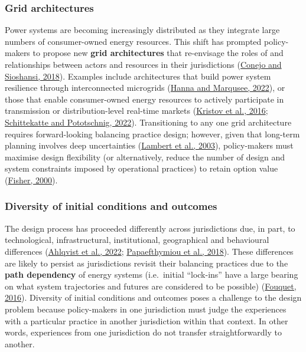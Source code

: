 \documentclass[12pt,a4paper,]{report}
\begin{document}
\hypertarget{grid-architectures}{%
\subsubsection{Grid architectures}\label{grid-architectures}}

Power systems are becoming increasingly distributed as they integrate
large numbers of consumer-owned energy resources. This shift has
prompted policy-makers to propose new \textbf{grid architectures} that
re-envisage the roles of and relationships between actors and resources
in their jurisdictions
(\protect\hyperlink{ref-conejoRethinkingRestructuredElectricity2018}{Conejo
and Sioshansi, 2018}). Examples include architectures that build power
system resilience through interconnected microgrids
(\protect\hyperlink{ref-hannaDesigningResilientDecentralized2022}{Hanna
and Marqusee, 2022}), or those that enable consumer-owned energy
resources to actively participate in transmission or distribution-level
real-time markets
(\protect\hyperlink{ref-kristovTaleTwoVisions2016}{Kristov et al.,
2016};
\protect\hyperlink{ref-schittekatteDistributedEnergyResources2022}{Schittekatte
and Pototschnig, 2022}). Transitioning to any one grid architecture
requires forward-looking balancing practice design; however, given that
long-term planning involves deep uncertainties
(\protect\hyperlink{ref-lambertChallengeLongTermPolicy2003}{Lambert et
al., 2003}), policy-makers must maximise design flexibility (or
alternatively, reduce the number of design and system constraints
imposed by operational practices) to retain option value
(\protect\hyperlink{ref-fisherInvestmentUncertaintyOption2000}{Fisher,
2000}).

\hypertarget{diversity-of-initial-conditions-and-outcomes}{%
\subsubsection{Diversity of initial conditions and
outcomes}\label{diversity-of-initial-conditions-and-outcomes}}

The design process has proceeded differently across jurisdictions due,
in part, to technological, infrastructural, institutional, geographical
and behavioural differences
(\protect\hyperlink{ref-ahlqvistSurveyComparingCentralized2022}{Ahlqvist
et al., 2022};
\protect\hyperlink{ref-papaefthymiouPowerSystemFlexibility2018}{Papaefthymiou
et al., 2018}). These differences are likely to persist as jurisdictions
revisit their balancing practices due to the \textbf{path dependency} of
energy systems (i.e.~initial ``lock-ins'' have a large bearing on what
system trajectories and futures are considered to be possible)
(\protect\hyperlink{ref-fouquetPathDependenceEnergy2016}{Fouquet,
2016}). Diversity of initial conditions and outcomes poses a challenge
to the design problem because policy-makers in one jurisdiction must
judge the experiences with a particular practice in another jurisdiction
within that context. In other words, experiences from one jurisdiction
do not transfer straightforwardly to another.
\end{document}
